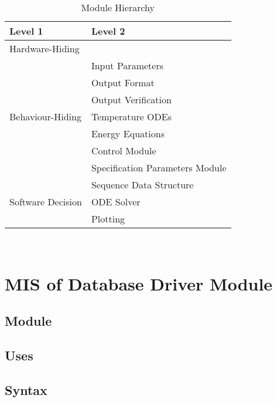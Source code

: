\documentclass[12pt, titlepage]{article}
\begin{document}
\begin{table}[h!]
\centering
\begin{tabular}{p{} p{}}
\toprule
\textbf{Level 1} & \textbf{Level 2}\\
\midrule

{Hardware-Hiding} & ~ \\
\midrule

\multirow{7}{0.3\textwidth}{Behaviour-Hiding} & Input Parameters\\
& Output Format\\
& Output Verification\\
& Temperature ODEs\\
& Energy Equations\\ 
& Control Module\\
& Specification Parameters Module\\
\midrule

\multirow{3}{0.3\textwidth}{Software Decision} & {Sequence Data Structure}\\
& ODE Solver\\
& Plotting\\
\bottomrule

\end{tabular}
\caption{Module Hierarchy}
\label{TblMH}
\end{table}

\newpage
~\newpage

\section{MIS of Database Driver Module} \label{mDBDriver}



\subsection{Module}


\subsection{Uses}


\subsection{Syntax}
\end{document}
